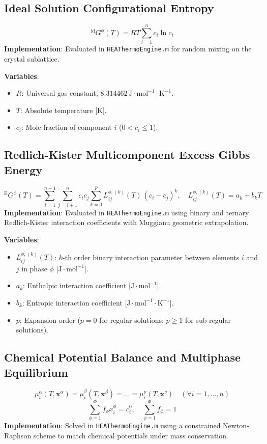 \documentclass[11pt,a4paper]{article}
\begin{document}
\subsection{Ideal Solution Configurational Entropy}
\begin{equation}
{^{\text{id}}}G^\phi(T) = R T \sum_{i=1}^n c_i \ln c_i
\end{equation}
\textbf{Implementation}: Evaluated in \texttt{HEAThermoEngine.m} for random mixing on the crystal sublattice.

\noindent\textbf{Variables}:
\begin{itemize}
  \item $R$: Universal gas constant, $8.314462 \, \text{J}\cdot\text{mol}^{-1}\cdot\text{K}^{-1}$.
  \item $T$: Absolute temperature [$\text{K}$].
  \item $c_i$: Mole fraction of component $i$ ($0 < c_i \le 1$).
\end{itemize}

\subsection{Redlich-Kister Multicomponent Excess Gibbs Energy}
\begin{equation}
{^{\text{E}}}G^\phi(T) = \sum_{i=1}^{n-1}\sum_{j=i+1}^n c_i c_j \sum_{k=0}^p L_{ij}^{\phi, (k)}(T) \, (c_i - c_j)^k, \quad L_{ij}^{\phi, (k)}(T) = a_k + b_k T
\end{equation}
\textbf{Implementation}: Evaluated in \texttt{HEAThermoEngine.m} using binary and ternary Redlich-Kister interaction coefficients with Muggianu geometric extrapolation.

\noindent\textbf{Variables}:
\begin{itemize}
  \item $L_{ij}^{\phi, (k)}(T)$: $k$-th order binary interaction parameter between elements $i$ and $j$ in phase $\phi$ [$\text{J}\cdot\text{mol}^{-1}$].
  \item $a_k$: Enthalpic interaction coefficient [$\text{J}\cdot\text{mol}^{-1}$].
  \item $b_k$: Entropic interaction coefficient [$\text{J}\cdot\text{mol}^{-1}\cdot\text{K}^{-1}$].
  \item $p$: Expansion order ($p = 0$ for regular solutions; $p \ge 1$ for sub-regular solutions).
\end{itemize}

\subsection{Chemical Potential Balance and Multiphase Equilibrium}
\begin{equation}
\mu_i^\alpha(T, \mathbf{x}^\alpha) = \mu_i^\beta(T, \mathbf{x}^\beta) = \dots = \mu_i^\nu(T, \mathbf{x}^\nu) \quad (\forall i = 1, \dots, n)
\end{equation}
\begin{equation}
\sum_{\phi=1}^\Phi f_\phi x_i^\phi = c_i^0, \quad \sum_{\phi=1}^\Phi f_\phi = 1
\end{equation}
\textbf{Implementation}: Solved in \texttt{HEAThermoEngine.m} using a constrained Newton-Raphson scheme to match chemical potentials under mass conservation.
\end{document}
